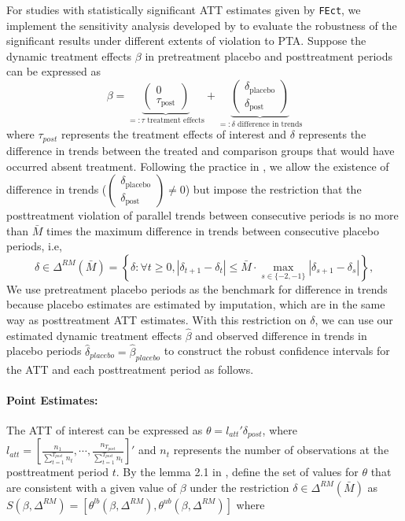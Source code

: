 \documentclass[12pt]{article}
\begin{document}
For studies with statistically significant ATT estimates given by \texttt{FEct}, we implement the sensitivity analysis developed by \citet{rambachan2023more} to evaluate the robustness of the significant results under different extents of violation to PTA. Suppose the dynamic treatment effects $\beta$ in pretreatment placebo and posttreatment periods can be expressed as $$\beta=\underbrace{\left(\begin{array}{c}
0 \\
\tau_{\text {post}}
\end{array}\right)}_{=: \tau \text{ treatment effects}}+\underbrace{\left(\begin{array}{c}
\delta_{\text {placebo}} \\
\delta_{\text {post}}
\end{array}\right)}_{=: \delta \text{ difference in trends}}$$ 
\noindent where $\tau_{post}$ represents the treatment effects of interest and $\delta$ represents the difference in trends between the treated and comparison groups that would have occurred absent treatment. Following the practice in \citet{rambachan2023more}, we allow the existence of difference in trends ($\left(\begin{array}{c}
\delta_{\text {placebo}} \\
\delta_{\text {post}}
\end{array}\right) \neq 0$) but impose the restriction that the posttreatment violation of parallel trends between consecutive periods is no more than $\bar{M}$ times the maximum difference in trends between consecutive placebo periods, i.e, 
$$\delta \in \Delta^{R M}(\bar{M})=\left\{\delta: \forall t \geq 0,\left|\delta_{t+1}-\delta_t\right| \leq \bar{M} \cdot \max _{s\in \{-2,-1\}}\left|\delta_{s+1}-\delta_s\right|\right\},$$ 
We use pretreatment placebo periods as the benchmark for difference in trends because placebo estimates are estimated by imputation, which are in the same way as posttreatment ATT estimates. With this restriction on $\delta$, we can use our estimated dynamic treatment effects $\hat{\beta}$ and observed difference in trends in placebo periods $\hat{\delta}_{placebo}=\hat{\beta}_{placebo}$ to construct the robust confidence intervals for the ATT and each posttreatment period as follows. 



\paragraph*{Point Estimates:} The ATT of interest can be expressed as $\theta = l_{att}'\delta_{post}$, where $l_{att}=[\frac{n_{1}}{\sum_{t=1}^{T_{post}}n_{t}}, \cdots, \frac{n_{T_{post}}}{\sum_{t=1}^{T_{post}}n_{t}}]'$ and $n_{t}$ represents the number of observations at the posttreatment period $t$. By the lemma 2.1 in \citet{rambachan2023more}, define the set of values for $\theta$ that are consistent with a given value of $\beta$ under the restriction $\delta \in \Delta^{RM}(\bar{M})$ as $S(\beta,\Delta^{RM}) = [\theta^{l b}(\beta, \Delta^{RM}), \theta^{u b}(\beta, \Delta^{RM})]$  where
\end{document}
